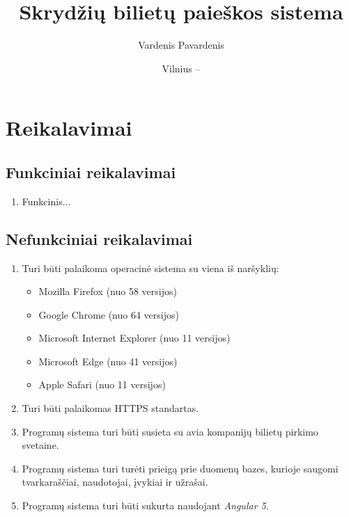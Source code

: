 \documentclass{VUMIFPSkursinis}
\title{Skrydžių bilietų paieškos sistema}
\author{Vardenis Pavardenis}
\date{Vilnius – \the\year}
\begin{document}
    \maketitle
      
        \tableofcontents
      
      
        \section{Reikalavimai}
            \subsection{Funkciniai reikalavimai}
                \begin{enumerate}[label=\textbf{FR\arabic*}.]
                    \item Funkcinis...
                \end{enumerate}
            \subsection{Nefunkciniai reikalavimai}
                \begin{enumerate}[label=\textbf{NFR\arabic*}.]
                    \item Turi būti palaikoma operacinė sistema su viena iš naršyklių:
                    \begin{itemize}
                        \item Mozilla Firefox (nuo 58 versijos)
                        \item Google Chrome (nuo 64 versijos)
                        \item Microsoft Internet Explorer (nuo 11 versijos)
                        \item Microsoft Edge (nuo 41 versijos)
                        \item Apple Safari (nuo 11 versijos)
                    \end{itemize}
                    \item Turi būti palaikomas HTTPS standartas.
                    \item Programų sistema turi būti susieta su avia kompanijų bilietų pirkimo svetaine.
                    \item Programų sistema turi turėti prieigą prie duomenų bazes, kurioje saugomi tvarkaraščiai, naudotojai, įvykiai ir užrašai.
                    \item Programų sistema turi būti sukurta naudojant \textit{Angular 5}.
                \end{enumerate}
      
\end{document}
